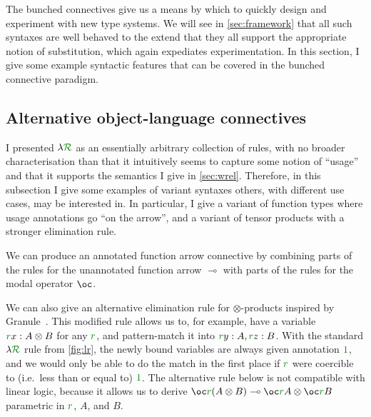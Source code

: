 The bunched connectives give us a means by which to quickly design and
experiment with new type systems.
We will see in \cref{sec:framework} that all such syntaxes are well behaved to
the extend that they all support the appropriate notion of substitution, which
again expediates experimentation.
In this section, I give some example syntactic features that can be covered in
the bunched connective paradigm.

\subsection{Alternative object-language connectives}

I presented $\name$ as an essentially arbitrary collection of rules, with no
broader characterisation than that it intuitively seems to capture some notion
of ``usage'' and that it supports the semantics I give in \cref{sec:wrel}.
Therefore, in this subsection I give some examples of variant syntaxes others,
with different use cases, may be interested in.
In particular, I give a variant of function types where usage annotations go
``on the arrow'', and a variant of tensor products with a stronger elimination
rule.

We can produce an annotated function arrow connective by combining parts of the
rules for the unannotated function arrow $\multimap$ with parts of the rules for
the modal operator $\oc$.


We can also give an alternative elimination rule for $\otimes$-products inspired
by Granule~\citep{Granule18,HMWO21}.
This modified rule allows us to, for example, have a variable
$\gr rx : A \otimes B$ for any $\gr r$, and pattern-match it into
$\gr ry : A, \gr rz : B$.
With the standard $\name$ rule from \cref{fig:lr}, the newly bound variables are
always given annotation $\gr 1$, and we would only be able to do the match in
the first place if $\gr r$ were coercible to (i.e.\ less than or equal to)
$\gr1$.
The alternative rule below is not compatible with linear logic, because it
allows us to derive
$\oc\gr r\plr{A \otimes B} \multimap \oc\gr rA \otimes \oc\gr r B$
parametric in $\gr r$, $A$, and $B$.

